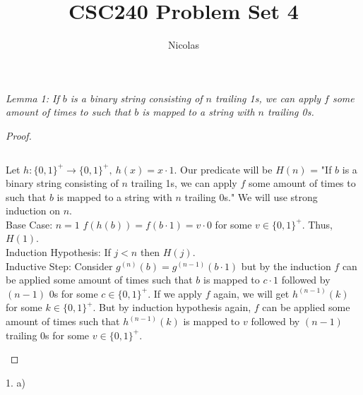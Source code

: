 \documentclass[11pt]{article}
\title{CSC240 Problem Set 4}
\author{Nicolas}
\newenvironment{myproof}
{\begin{proof} \begin{adjustwidth}{3em}{0pt}$ $\par\nobreak\ignorespaces}
{\end{adjustwidth} \end{proof}}
\begin{document}
\maketitle
\begin{flushleft}

\textit{Lemma 1: If $b$ is a binary string consisting of $n$ trailing 1s, we can apply $f$ some amount of times to such that $b$ is mapped to a string with $n$ trailing 0s.}

\begin{myproof}
Let $h: \{ 0, 1 \}^+ \to \{ 0, 1 \}^+, \ h(x) = x \cdot 1$. Our predicate will be $H(n)$ = "If $b$ is a binary string consisting of $n$ trailing 1s, we can apply $f$ some amount of times to such that $b$ is mapped to a string with $n$ trailing 0s." We will use strong induction on $n$. \\
\bigskip
Base Case: $n = 1$ $f(h(b)) = f(b \cdot 1) = v \cdot 0$ for some $v \in \{ 0 , 1 \}^+$. Thus, $H(1)$. \\
\bigskip
Induction Hypothesis: If $j < n$ then $H(j)$. \\
\bigskip
Inductive Step: Consider $g^{(n)}(b) = g^{(n-1)}( b \cdot 1)$ but by the induction $f$ can be applied some amount of times such that $b$ is mapped to $c \cdot 1$ followed by $(n-1)$ 0s for some $c \in \{ 0, 1 \}^+$. If we apply $f$ again, we will get $h^{(n-1)}(k)$ for some $k \in \{ 0 , 1 \}^+$. But by induction hypothesis again, $f$ can be applied some amount of times such that $h^{(n-1)}(k)$ is mapped to $v$ followed by $(n-1)$ trailing 0s for some $v \in \{0, 1 \}^+$.
\end{myproof}

1. a)


\end{flushleft}
\end{document}
